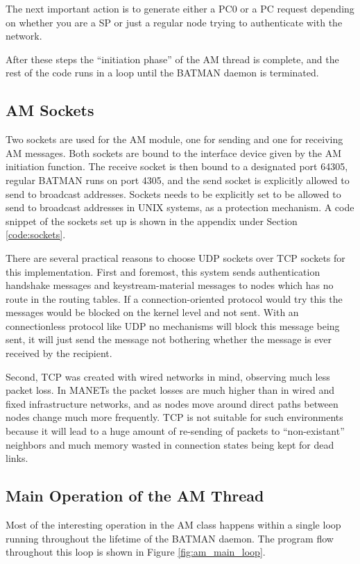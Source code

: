 The next important action is to generate either a \ac{PC0} or a \ac{PC} request
depending on whether you are a \ac{SP} or just a regular node trying to
authenticate with the network.

After these steps the ``initiation phase'' of the AM thread is complete, and the
rest of the code runs in a loop until the BATMAN daemon is terminated.

\subsection{AM Sockets}\label{subsect:am_socks}
Two sockets are used for the AM module, one for sending and one for receiving AM
messages. Both sockets are bound to the interface device given by the AM
initiation function. The receive socket is then bound to a designated port
64305, regular BATMAN runs on port 4305, and the send socket is explicitly
allowed to send to broadcast addresses. Sockets needs to be explicitly set to be
allowed to send to broadcast addresses in UNIX systems, as a protection
mechanism. A code snippet of the sockets set up is shown in the appendix under
Section \ref{code:sockets}.

There are several practical reasons to choose UDP sockets over TCP sockets for
this implementation. First and foremost, this system sends authentication
handshake messages and keystream-material messages to nodes which has no route
in the routing tables. If a connection-oriented protocol would try this the
messages would be blocked on the kernel level and not sent. With an
connectionless protocol like UDP no mechanisms will block this message being
sent, it will just send the message not bothering whether the message is ever
received by the recipient.

Second, TCP was created with wired networks in mind, observing much less packet
loss. In \acp{MANET} the packet losses are much higher than in wired and fixed
infrastructure networks, and as nodes move around direct paths between nodes
change much more frequently. TCP is not suitable for such environments because
it will lead to a huge amount of re-sending of packets to ``non-existant''
neighbors and much memory wasted in connection states being kept for dead links.

\subsection{Main Operation of the AM Thread}
Most of the interesting operation in the AM class happens within a single loop
running throughout the lifetime of the BATMAN daemon. The program flow
throughout this loop is shown in Figure \ref{fig:am_main_loop}.

